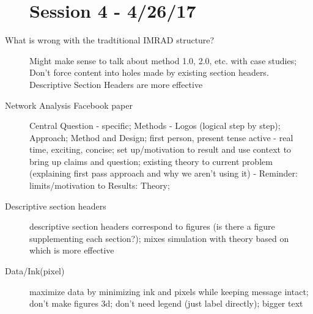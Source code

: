 \documentclass[10pt]{article}
\begin{document}
\begin{description}
\section{Session 4 - 4/26/17}
\item[What is wrong with the tradtitional IMRAD structure?]
    Might make sense to talk about method 1.0, 2.0, etc. with case studies;
    Don't force content into holes made by existing section headers.
    Descriptive Section Headers are more effective
\item[Network Analysis Facebook paper]
    Central Question - specific;
    Methods - Logos (logical step by step);
    Approach;
    Method and Design;
    first person, present tense active - real time, exciting, concise;
    set up/motivation to result and use context to bring up claims and question;
    existing theory to current problem (explaining  first pass approach and why we aren't using it)  - Reminder: limits/motivation to Results: Theory;
\item[Descriptive section headers]
    descriptive section headers correspond to figures (is there a figure supplementing each section?);
    mixes simulation with theory based on which is more effective
\item[Data/Ink(pixel)]
    maximize data by minimizing ink and pixels while keeping message intact;
    don't make figures 3d;
    don't need legend (just label directly);
    bigger text
\end{description}
\end{document}
